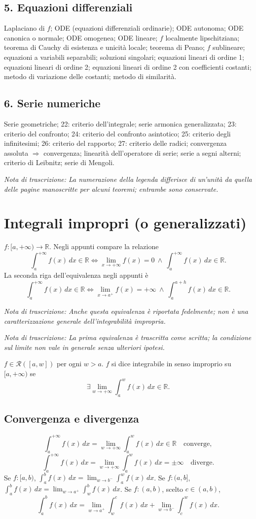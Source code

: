 \documentclass[11pt,a4paper]{article}
\newcommand{\R}{\mathbb R}\newcommand{\N}{\mathbb N}\newcommand{\pagina}[1]{\clearpage}
\newcommand{\nota}[1]{\par\textit{Nota di trascrizione: #1}\par}
\begin{document}
\subsection*{5. Equazioni differenziali}
Laplaciano di $f$; ODE (equazioni differenziali ordinarie); ODE autonoma; ODE canonica o normale; ODE omogenea; ODE lineare; $f$ localmente lipschitziana; teorema di Cauchy di esistenza e unicità locale; teorema di Peano; $f$ sublineare; equazioni a variabili separabili; soluzioni singolari; equazioni lineari di ordine 1; equazioni lineari di ordine 2; equazioni lineari di ordine 2 con coefficienti costanti; metodo di variazione delle costanti; metodo di similarità.
\subsection*{6. Serie numeriche}
Serie geometriche; 22: criterio dell'integrale; serie armonica generalizzata; 23: criterio del confronto; 24: criterio del confronto asintotico; 25: criterio degli infinitesimi; 26: criterio del rapporto; 27: criterio delle radici; convergenza assoluta $\Rightarrow$ convergenza; linearità dell'operatore di serie; serie a segni alterni; criterio di Leibnitz; serie di Mengoli.
\nota{La numerazione della legenda differisce di un'unità da quella delle pagine manoscritte per alcuni teoremi; entrambe sono conservate.}

\pagina{4}
\section*{Integrali impropri (o generalizzati)}
$f:[a,+\infty)\to\R$. Negli appunti compare la relazione
\[\int_a^{+\infty}f(x)\,dx\in\R\iff \lim_{x\to+\infty}f(x)=0\ \wedge\ \int_a^{+\infty}f(x)\,dx\in\R.\]
La seconda riga dell'equivalenza negli appunti è
\[\int_a^{+\infty}f(x)\,dx\in\R\iff\lim_{x\to a^+}f(x)=+\infty\ \wedge\ \int_a^{a+h}f(x)\,dx\in\R.\]
\nota{Anche questa equivalenza è riportata fedelmente; non è una caratterizzazione generale dell'integrabilità impropria.}
\nota{La prima equivalenza è trascritta come scritta; la condizione sul limite non vale in generale senza ulteriori ipotesi.}
$f\in\mathcal R([a,w])$ per ogni $w>a$. $f$ si dice integrabile in senso improprio su $[a,+\infty)$ se
\[\exists\lim_{w\to+\infty}\int_a^w f(x)\,dx\in\R.\]
\pagina{5}
\subsection*{Convergenza e divergenza}
\[\int_a^{+\infty}f(x)\,dx=\lim_{w\to+\infty}\int_a^w f(x)\,dx\in\R\quad\text{converge},\]
\[\int_a^{+\infty}f(x)\,dx=\lim_{w\to+\infty}\int_a^w f(x)\,dx=\pm\infty\quad\text{diverge}.\]
Se $f:[a,b)$, $\int_a^b f(x)\,dx=\lim_{w\to b^-}\int_a^w f(x)\,dx$.
Se $f:(a,b]$, $\int_a^b f(x)\,dx=\lim_{w\to a^+}\int_w^b f(x)\,dx$.
Se $f:(a,b)$, scelto $c\in(a,b)$,
\[\int_a^b f(x)\,dx=\lim_{w\to a^+}\int_w^c f(x)\,dx+\lim_{w\to b^-}\int_c^w f(x)\,dx.\]
\end{document}
